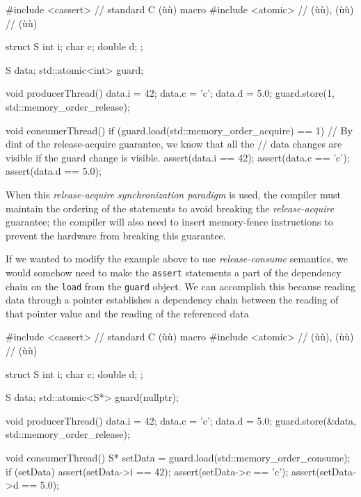 \begin{emcppslisting}
#include <cassert>  // standard C (ù{}ù) macro
#include <atomic>   // (ù{}ù), (ù{}ù)
                    // (ù{}ù)

struct S
{
    int i;
    char c;
    double d;
};

S data;
std::atomic<int> guard;

void producerThread()
{
    data.i = 42;
    data.c = 'c';
    data.d = 5.0;
    guard.store(1, std::memory_order_release);
}

void consumerThread()
{
    if (guard.load(std::memory_order_acquire) == 1)
    {
        // By dint of the release-acquire guarantee, we know that all the
        // data changes are visible if the guard change is visible.
        assert(data.i == 42);
        assert(data.c == 'c');
        assert(data.d == 5.0);
    }
}
\end{emcppslisting}
    
\noindent When this \emph{release-acquire} \emph{synchronization paradigm} is
used, the compiler must maintain the ordering of the statements to avoid
breaking the \emph{release-acquire} guarantee; the compiler will also
need to insert memory-fence instructions to prevent the hardware from
breaking this guarantee.

If we wanted to modify the example above to use \emph{release-consume}
semantics, we would somehow need to make the \lstinline!assert! statements
a part of the dependency chain on the \lstinline!load! from the
\lstinline!guard! object. We can accomplish this because reading data
through a pointer establishes a dependency chain between the reading of
that pointer value and the reading of the referenced data

\begin{emcppslisting}[emcppsbatch=e1]
#include <cassert>  // standard C (ù{}ù) macro
#include <atomic>   // (ù{}ù), (ù{}ù)
                    // (ù{}ù)

struct S
{
    int i;
    char c;
    double d;
};

S data;
std::atomic<S*> guard(nullptr);

void producerThread()
{
    data.i = 42;
    data.c = 'c';
    data.d = 5.0;
    guard.store(&data, std::memory_order_release);
}

void consumerThread()
{
    S* setData = guard.load(std::memory_order_consume);
    if (setData)
    {
        assert(setData->i == 42);
        assert(setData->c == 'c');
        assert(setData->d == 5.0);
    }
}
\end{emcppslisting}
    
